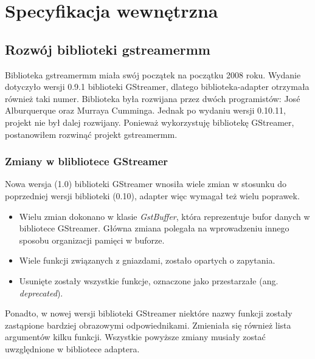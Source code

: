 \documentclass[12pt]{article}
\begin{document}
\section{Specyfikacja wewnętrzna}
\subsection{Rozwój biblioteki gstreamermm}
Biblioteka gstreamermm miała swój początek na początku 2008 roku. Wydanie dotyczyło wersji 0.9.1 biblioteki GStreamer, dlatego biblioteka-adapter otrzymała również taki numer. Biblioteka była rozwijana przez dwóch programistów: José Alburquerque oraz Murraya Cumminga. Jednak po wydaniu wersji 0.10.11, projekt nie był dalej rozwijany. Ponieważ wykorzystuję bibliotekę GStreamer, postanowiłem rozwinąć projekt gstreamermm.
\subsubsection{Zmiany w blibliotece GStreamer}
Nowa wersja (1.0) biblioteki GStreamer wnosiła wiele zmian w stosunku do poprzedniej wersji biblioteki (0.10), adapter więc wymagał też wielu poprawek. 
\begin{itemize}
 \setlength{\itemsep}{0em}
  \item Wielu zmian dokonano w klasie \textit{GstBuffer}, która reprezentuje bufor danych w bibliotece GStreamer. Główna zmiana polegała na wprowadzeniu innego sposobu organizacji pamięci w buforze.
  \item Wiele funkcji związanych z gniazdami, zostało opartych o zapytania.
  \item Usunięte zostały wszystkie funkcje, oznaczone jako przestarzałe (ang. \textit{deprecated}).
\end{itemize}
Ponadto, w nowej wersji biblioteki GStreamer niektóre nazwy funkcji zostały zastąpione bardziej obrazowymi odpowiednikami. Zmieniała się również lista argumentów kilku funkcji.
Wszystkie powyższe zmiany musiały zostać uwzględnione w bibliotece adaptera.
\end{document}
